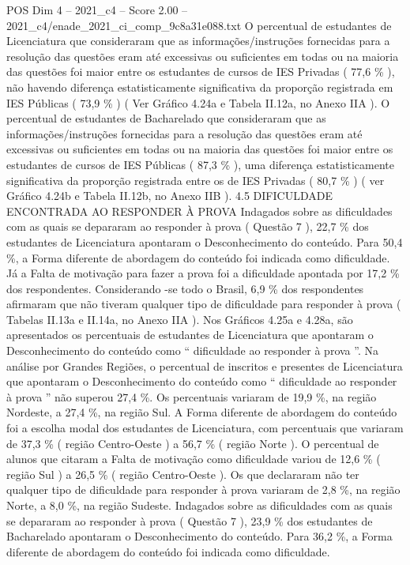 \begin{textsample}{POS Dim 4 – 2021\_c4 – Score 2.00 – 2021\_c4/enade\_2021\_ci\_comp\_9c8a31e088.txt}
O percentual de estudantes de Licenciatura que consideraram que as informações/instruções fornecidas para a resolução das questões eram até excessivas ou suficientes em todas ou na maioria das questões foi maior entre os estudantes de cursos de IES Privadas ( 77,6 \% ), não havendo diferença estatisticamente significativa da proporção registrada em IES Públicas ( 73,9 \% ) ( Ver Gráfico 4.24a e Tabela II.12a, no Anexo IIA ).
O percentual de estudantes de Bacharelado que consideraram que as informações/instruções fornecidas para a resolução das questões eram até excessivas ou suficientes em todas ou na maioria das questões foi maior entre os estudantes de cursos de IES Públicas ( 87,3 \% ), uma diferença estatisticamente significativa da proporção registrada entre os de IES Privadas ( 80,7 \% ) ( ver Gráfico 4.24b e Tabela II.12b, no Anexo IIB ). 4.5 DIFICULDADE ENCONTRADA AO RESPONDER À PROVA Indagados sobre as dificuldades com as quais se depararam ao responder à prova ( Questão 7 ), 22,7 \% dos estudantes de Licenciatura apontaram o Desconhecimento do conteúdo.
Para 50,4 \%, a Forma diferente de abordagem do conteúdo foi indicada como dificuldade.
Já a Falta de motivação para fazer a prova foi a dificuldade apontada por 17,2 \% dos respondentes.
Considerando -se todo o Brasil, 6,9 \% dos respondentes afirmaram que não tiveram qualquer tipo de dificuldade para responder à prova ( Tabelas II.13a e II.14a, no Anexo IIA ).
Nos Gráficos 4.25a e 4.28a, são apresentados os percentuais de estudantes de Licenciatura que apontaram o Desconhecimento do conteúdo como “ dificuldade ao responder à prova ”.
Na análise por Grandes Regiões, o percentual de inscritos e presentes de Licenciatura que apontaram o Desconhecimento do conteúdo como “ dificuldade ao responder à prova ” não superou 27,4 \%.
Os percentuais variaram de 19,9 \%, na região Nordeste, a 27,4 \%, na região Sul.
A Forma diferente de abordagem do conteúdo foi a escolha modal dos estudantes de Licenciatura, com percentuais que variaram de 37,3 \% ( região Centro-Oeste ) a 56,7 \% ( região Norte ).
O percentual de alunos que citaram a Falta de motivação como dificuldade variou de 12,6 \% ( região Sul ) a 26,5 \% ( região Centro-Oeste ).
Os que declararam não ter qualquer tipo de dificuldade para responder à prova variaram de 2,8 \%, na região Norte, a 8,0 \%, na região Sudeste.
Indagados sobre as dificuldades com as quais se depararam ao responder à prova ( Questão 7 ), 23,9 \% dos estudantes de Bacharelado apontaram o Desconhecimento do conteúdo.
Para 36,2 \%, a Forma diferente de abordagem do conteúdo foi indicada como dificuldade.

\end{textsample}
